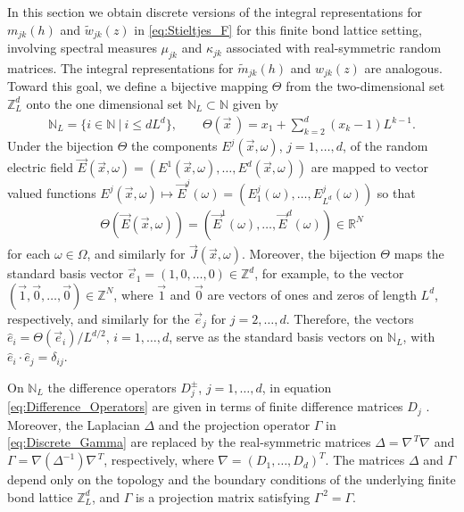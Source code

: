 \documentclass{cmslatex}
\begin{document}
In this section we obtain discrete versions of the integral
representations for $m_{jk}(h)$ and $\tilde{w}_{jk}(z)$ in
\eqref{eq:Stieltjes_F} for this finite bond lattice setting, involving
spectral measures $\mu_{jk}$ and $\kappa_{jk}$ associated with real-symmetric
random matrices. The integral representations for $\tilde{m}_{jk}(h)$ and
$w_{jk}(z)$ are analogous. Toward this goal, we define a bijective
mapping $\Theta$ from the two-dimensional set $\mathbb{Z}_L^d$ onto the one
dimensional set $\mathbb{N}_L\subset\mathbb{N}$ given by 
% 
\begin{align}\label{eq:Bijection_Z_N}
  \mathbb{N}_L=\{i\in\mathbb{N} \ | \ i\leq dL^d\}, \qquad
  \Theta(\vec{x}\,)=x_1+\sum_{k=2}^d(x_k-1)L^{k-1}.
\end{align}
%
Under the bijection $\Theta$ the components $E^j(\vec{x},\omega)$, $j=1,\ldots,d$, of
the random electric field
$\vec{E}(\vec{x},\omega)=(E^1(\vec{x},\omega),\ldots ,E^d(\vec{x},\omega))$ are mapped to
vector valued functions $E^j(\vec{x},\omega)\mapsto\vec{E}^j(\omega)=(E^j_1(\omega),\ldots,
E^j_{L^d}(\omega))$ so that
% 
\begin{align}\label{eq:bijection_vector_mapping}
  \Theta(\vec{E}(\vec{x},\omega))=(\vec{E}^1(\omega),\ldots ,\vec{E}^d(\omega))\in\mathbb{R}^N
\end{align}
%
for each $\omega\in\Omega$, and similarly for $\vec{J}(\vec{x},\omega)$. Moreover, the
bijection $\Theta$ maps the standard basis vector
$\vec{e}_1=(1,0,\ldots,0)\in\mathbb{Z}^d$, for example, to the
vector $(\vec{1},\vec{0},\ldots,\vec{0})\in\mathbb{Z}^N$, where
$\vec{1}$ and $\vec{0}$ are vectors of ones and zeros of length
$L^d$, respectively, and similarly for the $\vec{e}_j$ for
$j=2,\ldots,d$. Therefore, the vectors $\hat{e}_i=\Theta(\vec{e}_i)/L^{d/2}$,
$i=1,\ldots,d$, serve as the standard basis vectors on $\mathbb{N}_L$, with
$\hat{e}_i\cdot\hat{e}_j=\delta_{ij}$.


On $\mathbb{N}_L$ the difference operators $D_j^\pm$, $j=1,\ldots,d$, in
equation \eqref{eq:Difference_Operators} are given in terms of finite 
difference matrices $D_j$
\cite{Demmel:1997}. Moreover, the Laplacian $\Delta$ and
the projection operator $\Gamma$ in \eqref{eq:Discrete_Gamma} are replaced 
by the real-symmetric matrices $\Delta=\nabla^{\,T}\nabla$ and $\Gamma=\nabla(\Delta^{-1})\nabla^{\,T}$,
respectively, where $\nabla=(D_1,\ldots,D_d)^T$. The matrices $\Delta$ and $\Gamma$
depend only on the topology and the boundary conditions 
of the underlying finite bond lattice $\mathbb{Z}_L^d$, and $\Gamma$ is a
projection matrix satisfying $\Gamma^{\,2}=\Gamma$.
\end{document}
